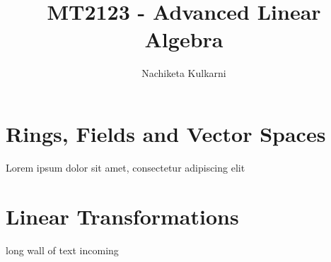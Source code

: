 \documentclass[12pt, oneside]{book}
\date{}
\title{MT2123 - Advanced Linear Algebra}
\author{Nachiketa Kulkarni}
\begin{document}
\maketitle
\tableofcontents

\mainmatter
\chapter{Rings, Fields and Vector Spaces}
Lorem ipsum dolor sit amet, consectetur adipiscing elit

\chapter{Linear Transformations}
long wall of text incoming
\end{document}
